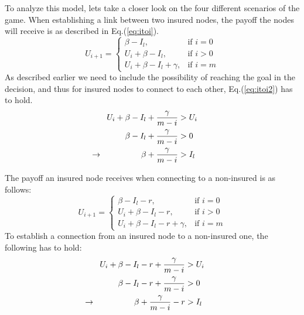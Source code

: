 To analyze this model, lets take a closer look on the four different scenarios of the game. When establishing a link between two insured nodes, the payoff the nodes will receive is as described in Eq.(\ref{eq:itoi}).
\begin{equation}
    U_{i+1}= 
\begin{cases}
    \beta - I_{l},& \text{if } i = 0\\
    U_{i}+\beta -I_{l},& \text{if }  i>0\\
    U_{i}+\beta -I_{l}+\gamma,& \text{if } i=m
    
\end{cases}
\label{eq:itoi}
\end{equation}
As described earlier we need to include the possibility of reaching the goal in the decision, and thus for insured nodes to connect to each other, Eq.(\ref{eq:itoi2}) has to hold.
\begin{eqnarray}
U_{i}+\beta-I_{l}+\frac{\gamma}{m-i}&>U_{i} \nonumber \\ 
\beta-I_{l}+\frac{\gamma}{m-i}&>0 \nonumber \\ 
\llap{$\rightarrow$\hspace{50pt}} \beta+\frac{\gamma}{m-i}&>I_{l} 
\label{eq:itoi2}
\end{eqnarray}

The payoff an insured node receives when connecting to a non-insured is as follows:
\begin{equation}
    U_{i+1}= 
\begin{cases}
    \beta  - I_{l} -r,& \text{if } i = 0\\
    U_{i}+\beta -I_{l}-r,& \text{if }  i>0\\
    U_{i}+\beta -I_{l}-r+\gamma,& \text{if } i=m
\end{cases}
\label{eq:itonoti}
\end{equation}
To establish a connection from an insured node to a non-insured one, the following has to hold:
\begin{eqnarray}
U_{i}+\beta-I_{l}-r+\frac{\gamma}{m-i}&>U_{i} \nonumber \\ 
\beta-I_{l}-r+\frac{\gamma}{m-i}&>0 \nonumber \\ 
\llap{$\rightarrow$\hspace{50pt}} \beta+\frac{\gamma}{m-i}-r&>I_{l} 
\end{eqnarray}

